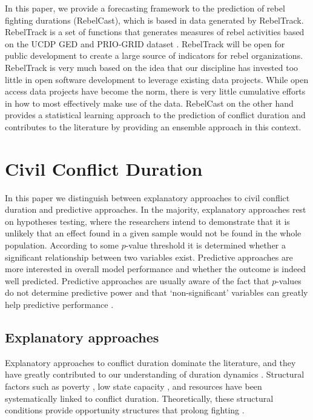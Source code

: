 \documentclass[11pt,oneside,fullpage]{amsart}
\begin{document}
In this paper, we provide a forecasting framework to the prediction of rebel fighting durations (RebelCast), which is based in data generated by RebelTrack. RebelTrack is a set of functions that generates measures of rebel activities based on the UCDP GED \citep{sundberg:2013} and PRIO-GRID dataset \citep{priogrid}. RebelTrack will be open for public development to create a large source of indicators for rebel organizations. RebelTrack is very much based on the idea that our discipline has invested too little in open software development to leverage existing data projects. While open access data projects have become the norm, there is very little cumulative efforts in how to most effectively make use of the data. RebelCast on the other hand provides a statistical learning approach to the prediction of conflict duration and contributes to the literature by providing an ensemble approach in this context. 

\section{Civil Conflict Duration}
In this paper we distinguish between explanatory approaches to civil conflict duration and predictive approaches. In the majority, explanatory approaches rest on hypotheses testing, where the researchers intend to demonstrate that it is unlikely that an effect found in a given sample would not be found in the whole population. According to some $p$-value threshold it is determined whether a significant relationship between two variables exist. Predictive approaches are more interested in overall model performance and whether the outcome is indeed well predicted. Predictive approaches are usually aware of the fact that $p$-values do not determine predictive power and that `non-significant' variables can greatly help predictive performance \citep{ward10}. 


\subsection{Explanatory approaches}
Explanatory approaches to conflict duration dominate the literature, and they have greatly contributed to our understanding of duration dynamics \citep{hegre2004duration}. Structural factors such as poverty \citep{collier04}, low state capacity \citep{Mason01121996,balch00,derouen04}, and resources \citep{buhaug2009geography} have been systematically linked to conflict duration. Theoretically, these structural conditions provide opportunity structures that prolong fighting \citep{collier04,fearon04,hironaka2009}.
\end{document}
